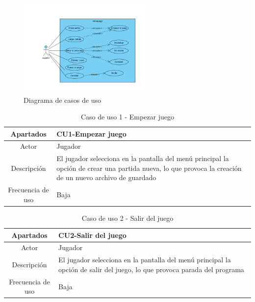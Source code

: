 \documentclass[a4paper]{article}
\begin{document}
\begin{figure}[ht]
    \centering
    \includegraphics[width=0.6\textwidth]{Images/diagramaCU.PNG}
    \caption{Diagrama de casos de uso}
    \label{fig:diagramas}
\end{figure}

\clearpage

\begin{table}[!ht]
    \centering
    \begin{tabular}{|c|p{12cm}|} 
        \hline
        \textbf{Apartados}       & \textbf{CU1-Empezar juego} \\
        \hline
        Actor                    & Jugador \\
        \hline
        Descripción              & El jugador selecciona en la pantalla del menú principal la opción de crear una partida nueva, lo que provoca la creación de un nuevo archivo de guardado \\
        \hline
        Frecuencia de uso        & Baja \\
        \hline
    \end{tabular}
    \caption{Caso de uso 1 - Empezar juego}
    \label{tab:casosdeuso01-table}
\end{table}

\begin{table}[!ht]
    \centering
    \begin{tabular}{|c|p{12cm}|} 
        \hline
        \textbf{Apartados}       & \textbf{CU2-Salir del juego} \\
        \hline
        Actor                    & Jugador \\
        \hline
        Descripción              & El jugador selecciona en la pantalla del menú principal la opción de salir del juego, lo que provoca parada del programa \\
        \hline
        Frecuencia de uso        & Baja \\
        \hline
    \end{tabular}
    \caption{Caso de uso 2 - Salir del juego}
    \label{tab:casosdeuso2-table}
\end{table}
\end{document}
